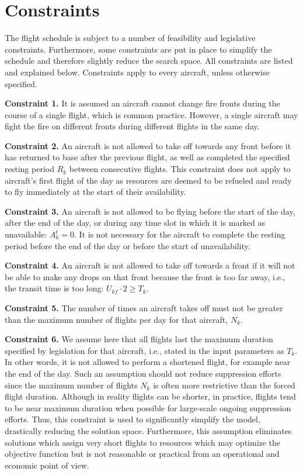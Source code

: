 \section{Constraints}\label{sec:constraints}

The flight schedule is subject to a number of feasibility and legislative constraints.
Furthermore, some constraints are put in place to simplify the schedule and therefore slightly reduce the search space.
All constraints are listed and explained below.
Constraints apply to every aircraft, unless otherwise specified.

\textbf{Constraint 1.} It is assumed an aircraft cannot change fire fronts during the course of a single flight, which is common practice.
However, a single aircraft may fight the fire on different fronts during different flights in the same day.

\textbf{Constraint 2.} An aircraft is not allowed to take off towards any front before it has returned to base after the previous flight, as well as completed the specified resting period $R_k$ between consecutive flights.
This constraint does not apply to aircraft's first flight of the day as resources are deemed to be refueled and ready to fly immediately at the start of their availability.

\textbf{Constraint 3.} An aircraft is not allowed to be flying before the start of the day, after the end of the day, or during any time slot in which it is marked as unavailable: $A_k^t = 0$.
It is not necessary for the aircraft to complete the resting period before the end of the day or before the start of unavailability.

\textbf{Constraint 4.} An aircraft is not allowed to take off towards a front if it will not be able to make any drops on that front because the front is too far away, i.e., the transit time is too long: $U_{kf} \cdot 2 \ge T_k$.

\textbf{Constraint 5.} The number of times an aircraft takes off must not be greater than the maximum number of flights per day for that aircraft, $N_k$.

\textbf{Constraint 6.} We assume here that all flights last the maximum duration specified by legislation for that aircraft, i.e., stated in the input parameters as $T_k$.
In other words, it is not allowed to perform a shortened flight, for example near the end of the day.
Such an assumption should not reduce suppression efforts since the maximum number of flights $N_k$ is often more restrictive than the forced flight duration.
Although in reality flights can be shorter, in practice, flights tend to be near maximum duration when possible for large-scale ongoing suppression efforts.
Thus, this constraint is used to significantly simplify the model, drastically reducing the solution space.
Furthermore, this assumption eliminates solutions which assign very short flights to resources which may optimize the objective function but is not reasonable or practical from an operational and economic point of view.

